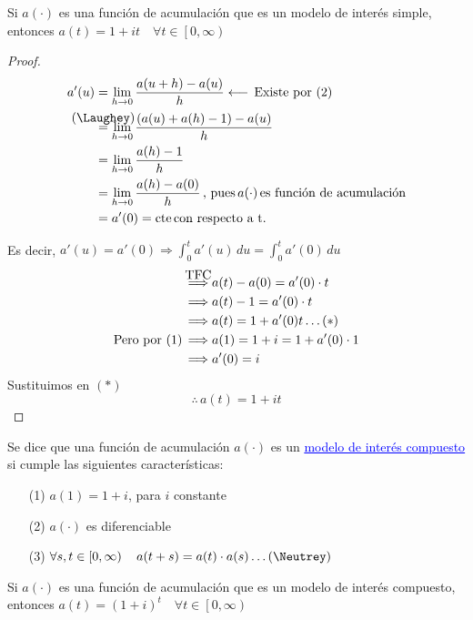 \begin{proposition}
Si $a(\cdot)$ es una función de acumulación que es un modelo de interés simple, entonces $a(t) = 1 + it \quad \forall t\in \left[0,\infty \right)$
\end{proposition} 

\begin{proof}
\begin{align*}
a'(u) &= \lim\limits_{h \to 0} \frac{a(u+h)-a(u)}{h} \longleftarrow \, \text{Existe por (2)} \\
&\stackrel{\mathclap{\normalfont\mbox{(\Laughey)}}}{=} \lim\limits_{h \to 0} \frac{\left(a(u)+a(h)-1 \right) - a(u)}{h}\\
&= \lim\limits_{h \to 0} \frac{a(h)-1}{h}\\
&= \lim\limits_{h \to 0} \frac{a(h)-a(0)}{h}\, \text{, pues} \, a(\cdot) \, \text{es función de acumulación}\\
&= a'(0) = \text{cte} \, \text{con respecto a t.}
\end{align*}

Es decir, $a'(u) = a'(0)\Longrightarrow \int_{0}^{t}a'(u)\,du = \int_{0}^{t}a'(0)\,du$
\begin{align*}
&\stackrel{\mathclap{\normalfont\mbox{\text{TFC}}}}{\Longrightarrow} a(t) - a(0) = a'(0)\cdot t\\
&\Longrightarrow a(t) - 1 = a'(0)\cdot t\\
&\Longrightarrow a(t) = 1 + a'(0)t \ldots (*)\\
\text{Pero por (1)} \, &\Longrightarrow a(1) = 1+i = 1 + a'(0)\cdot 1\\
& \Longrightarrow a'(0) = i
\end{align*}
Sustituimos en $(*)$
$$\therefore \, a(t) = 1+it$$
\end{proof}

\begin{definition}
Se dice que una función de acumulación $a(\cdot)$ es un \textcolor{blue}{\underline{modelo de interés compuesto}} si cumple las siguientes características:
\begin{enumerate}
\item[(1)] $a(1) = 1+i$, para $i$ constante
\item[(2)] $a(\cdot)$ es diferenciable
\item[(3)] $\forall s,t \in \left[0,\infty \right) \quad a(t+s)= a(t)\cdot a(s) \ldots (\Neutrey)$
\end{enumerate}
\end{definition}
\newpage 
\begin{proposition}
Si $a(\cdot)$ es una función de acumulación que es un modelo de interés compuesto, entonces $a(t) = (1+i)^t \quad \forall t\in \left[0,\infty \right)$
\end{proposition}

